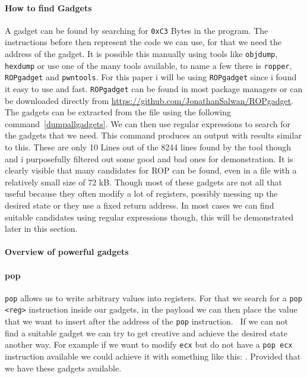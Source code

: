 \documentclass[journal=tosc,submission, notanonymous]{iacrtrans}
\begin{document}
\paragraph{How to find Gadgets}
\label{par:ropgadget}
A gadget can be found by searching for \Verb+0xC3+ Bytes in the program. The instructions before then represent the code we can use, for that we need the address of the gadget. It is possible this manually using tools like \Verb+objdump+, \Verb+hexdump+ or use one of the many tools available, to name a few there is \Verb+ropper+, \Verb+ROPgadget+ and \Verb+pwntools+. For this paper i will be using \Verb+ROPgadget+ since i found it easy to use and fast. \Verb+ROPgadget+ can be found in most package managers or can be downloaded directly from \url{https://github.com/JonathanSalwan/ROPgadget}. The gadgets can be extracted from the file using the following command~\cref{dumpallgadgets}. We can then use regular expressions to search for the gadgets that we need.
This command produces an output with results similar to this.
These are only 10 Lines out of the 8244 lines found by the tool though and i purposefully filtered out some good and bad ones for demonstration. It is clearly visible that many candidates for ROP can be found, even in a file with a relatively small size of 72 kB. Though most of these gadgets are not all that useful because they often modify a lot of registers, possibly messing up the desired state or they use a fixed return address. In most cases we can find suitable candidates using regular expressions though, this will be demonstrated later in this section.
\paragraph{Overview of powerful gadgets}
\paragraph{pop}
\Verb+pop+ allows us to write arbitrary values into registers. For that we search for a \Verb+pop <reg>+ instruction inside our gadgets, in the payload we can then place the value that we want to insert after the address of the \Verb+pop+ instruction.~\cite{ropsla} If we can not find a suitable gadget we can try to get creative and achieve the desired state another way. For example if we want to modify \Verb+ecx+ but do not have a \Verb+pop ecx+ instruction available we could achieve it with something like this: . Provided that we have these gadgets available.
\end{document}
